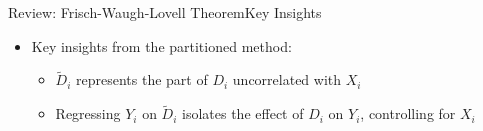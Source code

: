 \documentclass[dvipsnames,hyperref={pdfpagelabels=false}]{beamer}
\begin{document}
    \begin{frame}{Review: Frisch-Waugh-Lovell Theorem}{Key Insights}
       	\begin{itemize}
       		\item Key insights from the partitioned method:
       		       		\vspace{0.2cm}
       		\begin{itemize}
       			\item $\tilde{D}_i$ represents the part of $D_i$ uncorrelated with $X_i$
       			       		\vspace{0.2cm}
       			\item Regressing $Y_i$ on $\tilde{D}_i$ isolates the effect of $D_i$ on $Y_i$, controlling for $X_i$
       		\end{itemize}
       		
       	
       	\end{itemize}
       \end{frame}



%	
%
\end{document}
